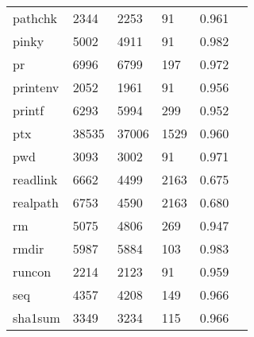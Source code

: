 \begin{longtable}{lp{2.4cm}p{2.4cm}p{2.4cm}p{2.4cm}p{2.4cm}}
pathchk   &                                    2344 &                        2253 &                           91 &                                   0.961 \\
pinky     &                                    5002 &                        4911 &                           91 &                                   0.982 \\
pr        &                                    6996 &                        6799 &                          197 &                                   0.972 \\
printenv  &                                    2052 &                        1961 &                           91 &                                   0.956 \\
printf    &                                    6293 &                        5994 &                          299 &                                   0.952 \\
ptx       &                                   38535 &                       37006 &                         1529 &                                   0.960 \\
pwd       &                                    3093 &                        3002 &                           91 &                                   0.971 \\
readlink  &                                    6662 &                        4499 &                         2163 &                                   0.675 \\
realpath  &                                    6753 &                        4590 &                         2163 &                                   0.680 \\
rm        &                                    5075 &                        4806 &                          269 &                                   0.947 \\
rmdir     &                                    5987 &                        5884 &                          103 &                                   0.983 \\
runcon    &                                    2214 &                        2123 &                           91 &                                   0.959 \\
seq       &                                    4357 &                        4208 &                          149 &                                   0.966 \\
sha1sum   &                                    3349 &                        3234 &                          115 &                                   0.966 \\

\end{longtable}
